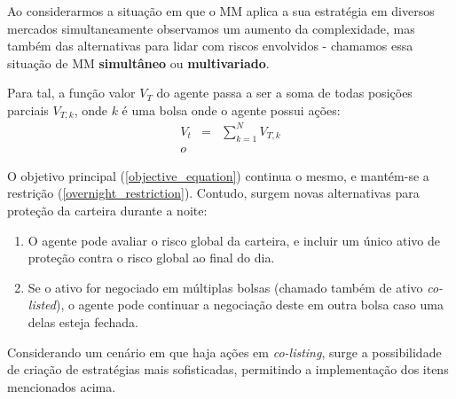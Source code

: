 Ao considerarmos a situação em que o MM aplica a sua estratégia em diversos mercados simultaneamente observamos um aumento da complexidade, mas também das alternativas para lidar com riscos envolvidos - chamamos essa situação de MM \textbf{simultâneo} ou \textbf{multivariado}.

Para tal, a função valor $V_{T}$ do agente passa a ser a soma de todas posições parciais $V_{T, k}$, onde $k$ é uma bolsa onde o agente possui ações:
\begin{eqnarray*}
    V_t &=& \sum_{k=1}^N V_{T, k}\\o
\end{eqnarray*}

O objetivo principal (\ref{objective_equation}) continua o mesmo, e mantém-se a restrição (\ref{overnight_restriction}). Contudo, surgem novas alternativas para proteção da carteira durante a noite:

\begin{enumerate}
    \item O agente pode avaliar o risco global da carteira, e incluir um único ativo de proteção contra o risco global ao final do dia.
    \item Se o ativo for negociado em múltiplas bolsas (chamado também de ativo \textit{co-listed}), o agente pode continuar a negociação deste em outra bolsa caso uma delas esteja fechada.
\end{enumerate}

Considerando um cenário em que haja ações em \textit{co-listing}, surge a possibilidade de criação de estratégias mais sofisticadas, permitindo a implementação dos itens mencionados acima.
